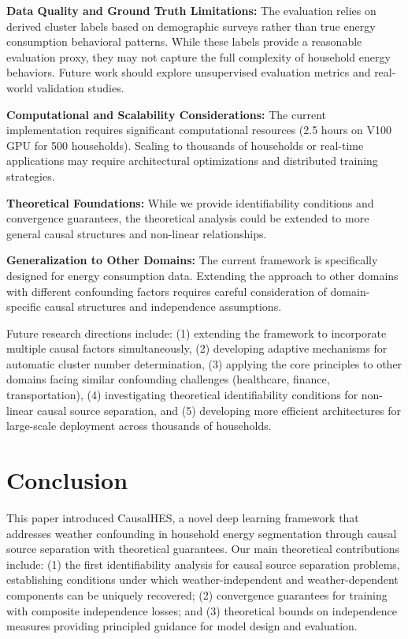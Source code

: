 \documentclass[journal]{IEEEtran}
\begin{document}
\textbf{Data Quality and Ground Truth Limitations:} The evaluation relies on derived cluster labels based on demographic surveys rather than true energy consumption behavioral patterns. While these labels provide a reasonable evaluation proxy, they may not capture the full complexity of household energy behaviors. Future work should explore unsupervised evaluation metrics and real-world validation studies.

\textbf{Computational and Scalability Considerations:} The current implementation requires significant computational resources (2.5 hours on V100 GPU for 500 households). Scaling to thousands of households or real-time applications may require architectural optimizations and distributed training strategies.

\textbf{Theoretical Foundations:} While we provide identifiability conditions and convergence guarantees, the theoretical analysis could be extended to more general causal structures and non-linear relationships.

\textbf{Generalization to Other Domains:} The current framework is specifically designed for energy consumption data. Extending the approach to other domains with different confounding factors requires careful consideration of domain-specific causal structures and independence assumptions.

Future research directions include: (1) extending the framework to incorporate multiple causal factors simultaneously, (2) developing adaptive mechanisms for automatic cluster number determination, (3) applying the core principles to other domains facing similar confounding challenges (healthcare, finance, transportation), (4) investigating theoretical identifiability conditions for non-linear causal source separation, and (5) developing more efficient architectures for large-scale deployment across thousands of households.

\section{Conclusion}
This paper introduced CausalHES, a novel deep learning framework that addresses weather confounding in household energy segmentation through causal source separation with theoretical guarantees. Our main theoretical contributions include: (1) the first identifiability analysis for causal source separation problems, establishing conditions under which weather-independent and weather-dependent components can be uniquely recovered; (2) convergence guarantees for training with composite independence losses; and (3) theoretical bounds on independence measures providing principled guidance for model design and evaluation.
\end{document}
